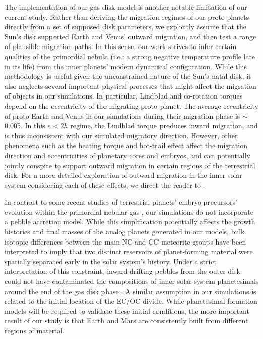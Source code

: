 \documentclass[trackchanges,twocolumn]{aastex}
\begin{document}
The implementation of our gas disk model is another notable limitation of our current study.  Rather than deriving the migration regimes of our proto-planets directly from a set of supposed disk parameters, we explicitly assume that the Sun's disk supported Earth and Venus' outward migration, and then test a range of plausible migration paths.  In this sense, our work strives to infer certain qualities of the primordial nebula (i.e.: a strong negative temperature profile late in its life) from the inner planets' modern dynamical configuration.  While this methodology is useful given the unconstrained nature of the Sun's natal disk, it also neglects several important physical processes that might affect the migration of objects in our simulations.  In particular, Lindblad and co-rotation torques \citep[driven by interactions with resonant density waves and gas traversing the disk on horseshoe-like orbits, respectively:][] {cresswell08,paardekooper11} depend on the eccentricity of the migrating proto-planet.  The average eccentricity of proto-Earth and Venus in our simulations during their migration phase is $\sim$0.005.  In this $e<2h$ regime, the Lindblad torque produces inward migration, and is thus inconsistent with our simulated migratory direction.  However, other phenomena such as the heating torque \citep{bentez15} and hot-trail effect \citep{chrenko17,eklund17} affect the migration direction and eccentricities of planetary cores and embryos, and can potentially jointly conspire to support outward migration in certain regions of the terrestrial disk.  For a more detailed exploration of outward migration in the inner solar system considering each of these effects, we direct the reader to \citet{broz21}.

In contrast to some recent studies of terrestrial planets' embryo precursors' evolution within the primordial nebular gas \citep[e.g.:][]{levison15,chambers16,ormel17,lambrechts19}, our simulations do not incorporate a pebble accretion model.  While this simplification potentially affects the growth histories and final masses of the analog planets generated in our models, bulk isotopic differences between the main NC and CC meteorite groups \citep[e.g.:][]{budde16} have been interpreted to imply that two distinct reservoirs of planet-forming material were spatially separated early in the solar system's history.  Under a strict interpretation of this constraint, inward drifting pebbles from the outer disk could not have contaminated the compositions of inner solar system planetesimals around the end of the gas disk phase \citep{kruijer17}. A similar assumption in our simulations is related to the initial location of the EC/OC divide.  While planetesimal formation models \citep[e.g.:][]{draz16} will be required to validate these initial conditions, the more important result of our study is that Earth and Mars are consistently built from different regions of material.
\end{document}

